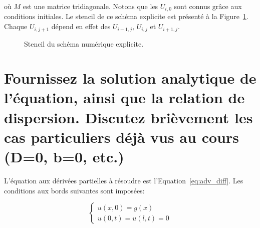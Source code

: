 \documentclass[a4paper, 12pt]{report}
\newcommand{\stencilpt}[4][]{\node[circle,fill,draw,inner sep=1.5pt,label={#4},#1] at (#2) (#3) {}}
\begin{document}
où $M$ est une matrice tridiagonale. Notons que les $U_{i,0}$ sont connus
grâce aux conditions initiales. Le stencil de ce schéma explicite est présenté
à la Figure~\ref{fig:stencil_schema_explicite}. Chaque $U_{i,j+1}$ dépend
en effet des $U_{i-1,j}$, $U_{i,j}$ et $U_{i+1,j}$.

\begin{figure}[H]
  \center
{}
\caption{Stencil du schéma numérique explicite.}
\label{fig:stencil_schema_explicite}
\end{figure}


\section{Fournissez la solution analytique de l'équation, ainsi que la relation
de dispersion. Discutez brièvement les cas particuliers déjà vus au cours (D=0, b=0, etc.)}

L'équation aux dérivées partielles à résoudre est l'Equation~\ref{eq:adv_diff}. Les conditions
aux bords suivantes sont imposées:

\begin{equation}
  \left \{
  \begin{aligned}
    u(x,0) = g(x)\\
    u(0,t) = u(l,t) = 0
  \end{aligned}
  \right.
\end{equation}
\end{document}
